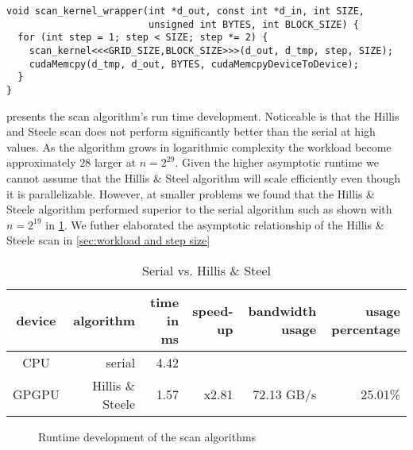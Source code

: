 \begin{lstlisting}[caption={Hillis and Steele scan kernel wrapper}, label={lst:scan wrapper}]
void scan_kernel_wrapper(int *d_out, const int *d_in, int SIZE, 
                         unsigned int BYTES, int BLOCK_SIZE) {
  for (int step = 1; step < SIZE; step *= 2) {
    scan_kernel<<<GRID_SIZE,BLOCK_SIZE>>>(d_out, d_tmp, step, SIZE);
    cudaMemcpy(d_tmp, d_out, BYTES, cudaMemcpyDeviceToDevice);
  }
}
\end{lstlisting}

 presents the scan algorithm's run time development.
Noticeable is that the Hillis and Steele scan does not perform significantly better than the serial at high values.
As the algorithm grows in logarithmic complexity the workload become approximately $28$ larger at $n=2^{29}$.
Given the higher asymptotic runtime we cannot assume that the Hillis \& Steel algorithm will scale efficiently even though it is parallelizable.
However, at smaller problems we found that the Hillis \& Steele algorithm performed superior to the serial algorithm such as shown with $n = 2^{19}$ in \cref{tab:cpu vs hillis steele}.
We futher elaborated the asymptotic relationship of the Hillis \& Steele scan in \cref{sec:workload and step size}

\begin{table}[htb]
  \centering
  \begin{tabular}{c r | r r r r}
    \toprule
    device & algorithm & time in ms & speed-up & bandwidth usage & usage percentage\\
    \midrule
    CPU & serial  & 4.42 &  &  &  \\
    GPGPU & Hillis \& Steele & 1.57 & x2.81 & 72.13 GB/s & 25.01\% \\
    \bottomrule
  \end{tabular}
  \caption{Serial vs. Hillis \& Steel}
  \label{tab:cpu vs hillis steele}
\end{table}

\begin{figure}[htb]
  \centering
  
  \caption{Runtime development of the scan algorithms}
  \label{fig:scan plot}
\end{figure}%
